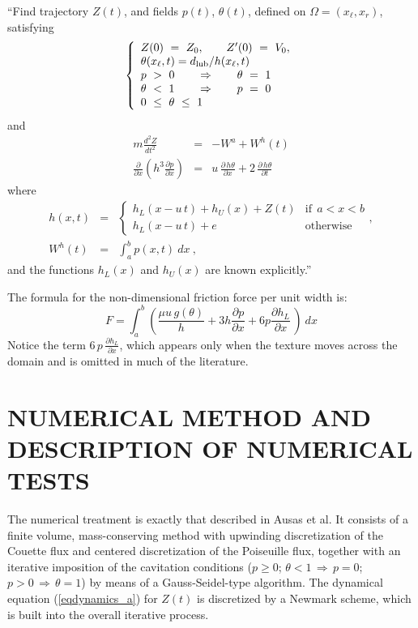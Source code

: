 ``Find trajectory $Z(t)$, and fields $p(t)$, $\theta(t)$, defined
on $\Omega = (x_\ell,x_r)$, satisfying
\begin{equation}
\left \{
\begin{array}{l}
Z(0) ~ = ~ Z_{0}, \qquad Z'(0) ~ = ~ V_{0}, \\
\theta(x_\ell,t) = d_{\mbox{\scriptsize lub}}/h(x_\ell,t) \\
p~>~0 \qquad \Rightarrow \qquad \theta~ =~ 1 \\
\theta~<~1\qquad \Rightarrow \qquad p~=~0\\
0~\leq~\theta~\leq~1
\end{array}
\right.
\end{equation}
and
\begin{eqnarray}
m \frac{d^2Z}{dt^2}  &=&  -W^{a}+W^{h}(t)
\label{eqdynamics_a}\\
\frac{\partial }{\partial x} \left ( h^3 \frac{\partial p}{\partial x} \right ) &=&  
 u \,\frac{\partial\, h\theta}{\partial x} + 
 2\,\frac{\partial\, h\theta}{\partial t}
\label{eqptheta}
\end{eqnarray}
where
\begin{eqnarray}
h(x,t)&=& \left \{
\begin{array}{ll}
h_L(x-u\,t)+h_U(x)+Z(t)&\mbox{if}~~a < x < b\\
h_L(x-u\,t)+e& \mbox{otherwise}
\end{array} \right. ,\\
W^{h}(t)&=&\int_{a}^{b} p(x,t)~dx~,
\end{eqnarray}
and the functions $h_L(x)$ and $h_U(x)$ are known explicitly.''

The formula for the non-dimensional friction force per unit width is:
\begin{equation} \label{eq:adim-friction}
F = \int_a^{b}
\left ( \frac{\mu u\,g(\theta)}{h}+3h\frac{\partial p}{\partial x}
+6p\frac{\partial h_{L}}{\partial x}
 \,\right ) ~dx
\end{equation}
Notice the term $6\,p\,\frac{\partial h_L}{\partial x}$, 
which appears only when the texture moves across the domain
and is omitted in much of the literature.

\section{NUMERICAL METHOD AND DESCRIPTION OF NUMERICAL TESTS}

The numerical treatment is exactly that described in
Ausas et al\cite{ausas09}. %
It consists of a finite volume, mass-conserving
method with upwinding discretization of the Couette flux and
centered discretization of the Poiseuille flux, together with an iterative
imposition of the cavitation conditions ($p \geq 0$;
$\theta < 1\,\Rightarrow\,p=0$; $p>0\,\Rightarrow\,\theta=1$)
by means of a Gauss-Seidel-type algorithm. 
The dynamical equation (\ref{eqdynamics_a}) for
$Z(t)$ is discretized by a Newmark scheme, which is built into
the overall iterative process. 

